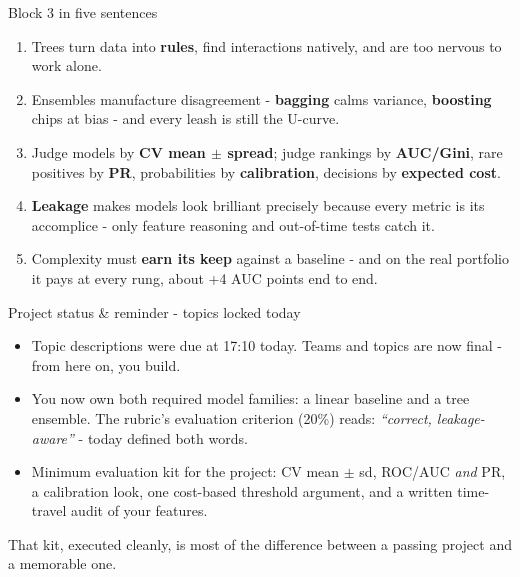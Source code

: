\documentclass[10pt,aspectratio=169]{beamer}
\begin{document}
\begin{frame}{Block 3 in five sentences}
  \begin{enumerate}
    \item Trees turn data into \textbf{rules}, find interactions natively,
          and are too nervous to work alone.
    \item Ensembles manufacture disagreement - \textbf{bagging} calms
          variance, \textbf{boosting} chips at bias - and every leash is
          still the U-curve.
    \item Judge models by \textbf{CV mean $\pm$ spread}; judge rankings by
          \textbf{AUC/Gini}, rare positives by \textbf{PR}, probabilities by
          \textbf{calibration}, decisions by \textbf{expected cost}.
    \item \textbf{Leakage} makes models look brilliant precisely because
          every metric is its accomplice - only feature reasoning and
          out-of-time tests catch it.
    \item Complexity must \textbf{earn its keep} against a baseline -
          and on the real portfolio it pays at every rung, about +4 AUC
          points end to end.
  \end{enumerate}
\end{frame}

\begin{frame}{Project status \& reminder - topics locked today}
  \begin{itemize}
    \item \alert{Topic descriptions were due at 17:10 today.} Teams and
          topics are now final - from here on, you build.
    \item You now own both required model families: a linear baseline and a
          tree ensemble. The rubric's evaluation criterion (20\%) reads:
          \emph{``correct, leakage-aware''} - today defined both words.
    \item Minimum evaluation kit for the project: CV mean $\pm$ sd,
          ROC/AUC \emph{and} PR, a calibration look, one cost-based
          threshold argument, and a written time-travel audit of your
          features.
  \end{itemize}
  \vspace{0.5em}
  \begin{center}\small
    That kit, executed cleanly, is most of the difference between a passing
    project and a memorable one.
  \end{center}
\end{frame}
\end{document}
